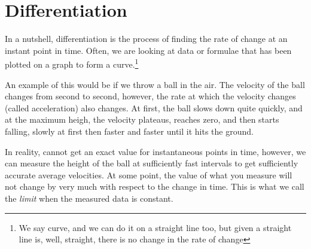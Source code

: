 \newpage
\chapter{Differentiation}
\label{sec:Differentiation}
In a nutshell, differentiation is the process of finding the rate of change at
an instant point in time. Often, we are looking at data or formulae that has
been plotted on a graph to form a curve.\footnote{We say curve, and we can do it
on a straight line too, but given a straight line is, well, straight, there is
no change in the rate of change}

An example of this would be if we throw a ball in the air. The velocity of the
ball changes from second to second, however, the rate at which the velocity
changes (called acceleration) also changes. At first, the ball slows down quite
quickly, and at the maximum heigh, the velocity plateaus, reaches zero, and then
starts falling, slowly at first then faster and faster until it hits the ground.

In reality, cannot get an exact value for instantaneous points in time, however,
we can measure the height of the ball at sufficiently fast intervals to
get sufficiently accurate average velocities. At some point, the value of what
you measure will not change by very much with respect to the change in time.
This is what we call the \emph{limit} when the measured data is constant.

